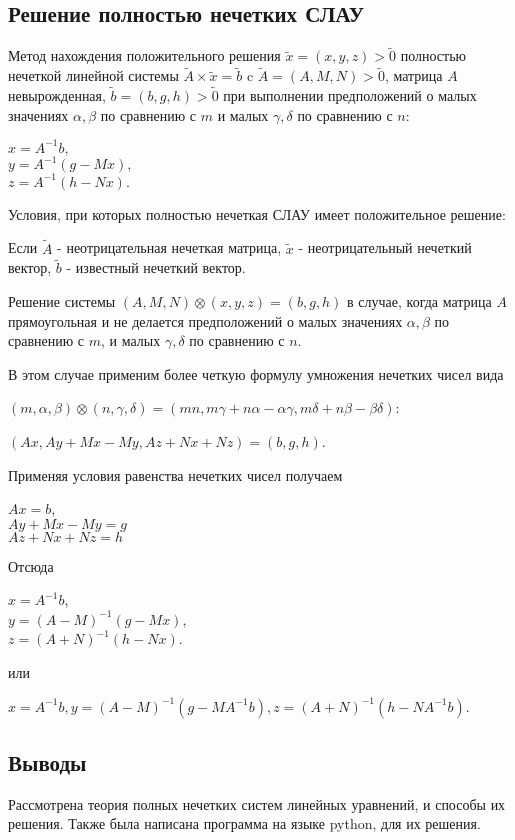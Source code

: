 \documentclass[12pt]{article}
\begin{document}
\subsection{Решение полностью нечетких СЛАУ}

Метод нахождения положительного решения $\tilde{x} = (x, y, z) > \tilde{0}$
полностью нечеткой линейной системы $\tilde{A} \times \tilde{x} = \tilde{b}$ c 
$\tilde{A} = (A, M, N) > \tilde{0}$, матрица $A$ невырожденная, $\tilde{b} = (b,
g, h) > \tilde{0}$ при выполнении предположений о малых значениях $\alpha,
\beta$ по сравнению с $m$ и малых $\gamma, \delta$ по сравнению с $n$:

\begin{center}
  $x = A^{-1}b, $ \\
  $y = A^{-1}(g - Mx),$ \\
  $z = A^{-1} (h - Nx).$ \\
\end{center}

Условия, при которых полностью нечеткая СЛАУ имеет положительное решение:

Если $\tilde{A}$ - неотрицательная нечеткая матрица, $\tilde{x} $ -
неотрицательный нечеткий вектор, $\tilde{b}$ - известный нечеткий вектор.

\par

Решение системы $(A, M, N) \otimes (x, y, z) = (b, g, h)$ в случае, когда
матрица $A$ прямоугольная и не делается предположений о малых значениях $\alpha,
\beta$ по сравнению с $m$, и малых $\gamma, \delta$ по сравнению с $n$.

В этом случае применим более четкую формулу умножения нечетких чисел вида

$ (m, \alpha, \beta) \otimes (n, \gamma, \delta) = (mn, m \gamma + n \alpha -
\alpha \gamma, m \delta + n \beta - \beta \delta )$:

$(Ax, Ay + Mx - My, Az + Nx + Nz) = (b, g, h)$.

Применяя условия равенства нечетких чисел получаем

\begin{center}
$ Ax = b $, \\
$ Ay + Mx - My = g $ \\
$ Az + Nx + Nz = h $ \\
\end{center}

Отсюда

\begin{center}
  $ x = A^{-1}b $, \\
  $ y = (A - M)^{-1} (g - Mx) $, \\
  $ z = (A + N)^{-1} (h - Nx) $.
\end{center}

или

\begin{center}
$ x = A^{-1}b, y = (A - M)^{-1} (g - MA^{-1}b), z = (A + N)^{-1} (h - NA^{-1}b) $.
\end{center}


\subsection{Выводы}
Рассмотрена теория полных нечетких систем линейных уравнений, и способы их
решения. Также была написана программа на языке python, для их решения.
\end{document}
